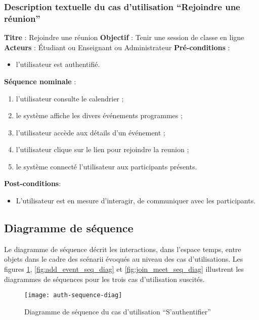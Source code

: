\subsubsection{Description textuelle du cas d’utilisation “Rejoindre une réunion”}
\textbf{Titre} : Rejoindre une réunion\newline
\textbf{Objectif} : Tenir une session de classe en ligne\newline
\textbf{Acteurs} : Étudiant ou Enseignant ou Administrateur\newline
\textbf{Pré-conditions} : 
\begin{itemize}[noitemsep,topsep=0pt]
  \item l’utilisateur est authentifié.
\end{itemize}
\textbf{Séquence nominale} :
\begin{enumerate}[noitemsep,topsep=0pt]
  \item  l’utilisateur consulte le calendrier ;
	\item le système affiche les divers événements programmes ;
	\item l’utilisateur accède aux détails d’un événement ;
	\item l’utilisateur clique sur le lien pour rejoindre la reunion ;
	\item le système connecté l’utilisateur aux participants présents.
\end{enumerate}
\textbf{Post-conditions}: 
\begin{itemize}[noitemsep,topsep=0pt]
  \item L’utilisateur est en mesure d’interagir, de communiquer avec les participants.
\end{itemize}

\subsection{Diagramme de séquence}
Le diagramme de séquence décrit les interactions, dans l’espace temps, entre objets dans le cadre des scénarii évoqués au niveau des cas d’utilisations. 
Les figures \ref{fig:auth_seq_diag}, \ref{fig:add_event_seq_diag} et \ref{fig:join_meet_seq_diag} illustrent les diagrammes de séquences pour les trois cas d’utilisation suscités.


\begin{figure}[H]
  \centering
  \texttt{[image: auth-sequence-diag]}
  \caption{Diagramme de séquence du cas d'utilisation “S’authentifier”}
  \label{fig:auth_seq_diag}
\end{figure}

